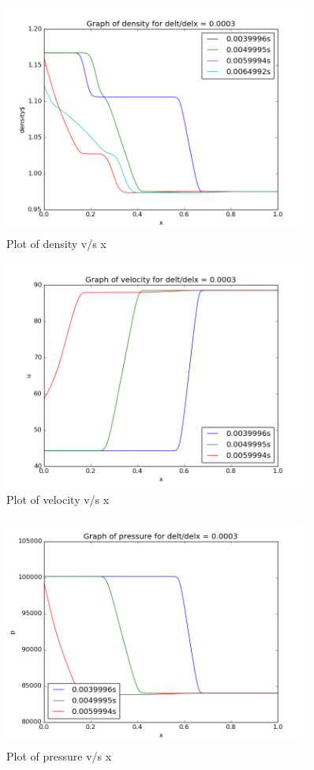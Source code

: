 \documentclass[11pt, a4paper]{article}
\begin{document}
\begin{figure}[H]
 \centering
 \includegraphics[width = 0.9\textwidth]{FTCS2_2_2.png}
 \caption{Plot of density v/s x}
\end{figure}
\begin{figure}[H]
 \centering
 \includegraphics[width = 0.9\textwidth]{FTCS2_2_5.png}
 \caption{Plot of velocity v/s x}
\end{figure}
\begin{figure}[H]
 \centering
 \includegraphics[width = 0.9\textwidth]{FTCS2_2_8.png}
 \caption{Plot of pressure v/s x}
\end{figure}
\end{document}
